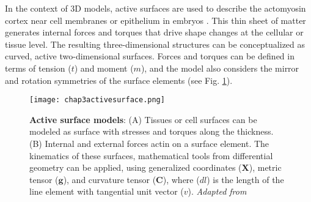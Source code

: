In the context of 3D models, active surfaces are used to describe the actomyosin cortex near cell membranes or epithelium in embryos \cite{salbreux2017}. This thin sheet of matter generates internal forces and torques that drive shape changes at the cellular or tissue level. The resulting three-dimensional structures can be conceptualized as curved, active two-dimensional surfaces. Forces and torques can be defined in terms of tension (\(t\)) and moment (\(m\)), and the model also considers the mirror and rotation symmetries of the surface elements (see Fig. \ref{fig_3_9}).
%
%

\begin{figure}
	\begin{minipage}[c]{0.5\textwidth}
		\texttt{[image: chap3activesurface.png]}
	\end{minipage}\hfill
	\begin{minipage}[c]{0.45\textwidth}
		\caption{\textbf{Active surface models}: (A) Tissues or cell surfaces can be modeled as surface with stresses and torques along the thickness. (B) Internal and external forces actin on a surface element. The kinematics of these surfaces, mathematical tools from differential geometry can be applied, using generalized coordinates ($\mathbf{X}$), metric tensor ($\mathbf{g}$), and curvature tensor ($\mathbf{C}$), where ($dl$) is the length of the line element with tangential unit vector ($v$). \textit{Adapted from \cite{salbreux2017}}
		} \label{fig_3_9}
	\end{minipage}
\end{figure}





